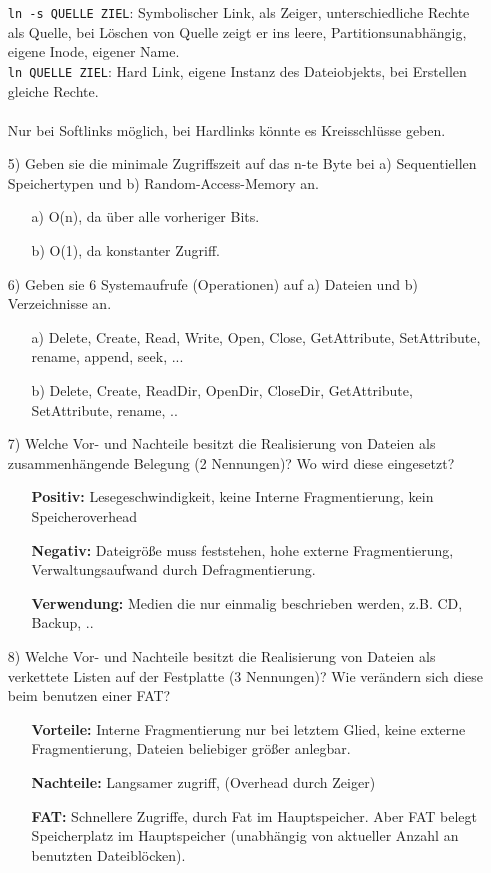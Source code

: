 \documentclass[11pt,a4paper]{article}
\begin{document}
\begin{itemize}
\texttt{ln -s QUELLE ZIEL}: Symbolischer Link, als Zeiger, unterschiedliche Rechte als Quelle, bei Löschen von Quelle zeigt er ins leere, Partitionsunabhängig, eigene Inode, eigener Name.\\
\texttt{ln QUELLE ZIEL}: Hard Link, eigene Instanz des Dateiobjekts, bei Erstellen gleiche Rechte.\\
\\ Nur bei Softlinks möglich, bei Hardlinks könnte es Kreisschlüsse geben.


\item[5)] Geben sie die minimale Zugriffszeit auf das n-te Byte bei a) Sequentiellen Speichertypen und b) Random-Access-Memory an.
\begin{itemize}
\item[a)] O(n), da über alle vorheriger Bits.
\item[b)] O(1), da konstanter Zugriff. 
\end{itemize}

\item[6)] Geben sie 6 Systemaufrufe (Operationen) auf a) Dateien und b) Verzeichnisse an.
\begin{itemize}
\item[a)] Delete, Create, Read, Write, Open, Close, GetAttribute, SetAttribute, rename, append, seek, ...
\item[b)] Delete, Create, ReadDir, OpenDir, CloseDir, GetAttribute, SetAttribute, rename, ..
\end{itemize}


\item[7)] Welche Vor- und Nachteile besitzt die Realisierung von Dateien als zusammenhängende Belegung (2 Nennungen)? Wo wird diese eingesetzt?
\begin{itemize}
\item[] \textbf{Positiv:} Lesegeschwindigkeit, keine Interne Fragmentierung, kein Speicheroverhead
\item[] \textbf{Negativ:} Dateigröße muss feststehen, hohe externe Fragmentierung, Verwaltungsaufwand durch Defragmentierung.
\item[] \textbf{Verwendung:} Medien die nur einmalig beschrieben werden, z.B. CD, Backup, ..
\end{itemize}

\item[8)] Welche Vor- und Nachteile besitzt die Realisierung von Dateien als verkettete Listen auf der Festplatte (3 Nennungen)? Wie verändern sich diese beim benutzen einer FAT?
\begin{itemize}
\item[] \textbf{Vorteile:} Interne Fragmentierung nur bei letztem Glied, keine externe Fragmentierung, Dateien beliebiger größer anlegbar.
\item[] \textbf{Nachteile:} Langsamer zugriff, (Overhead durch Zeiger)
\item[] \textbf{FAT:} Schnellere Zugriffe, durch Fat im Hauptspeicher. Aber FAT belegt Speicherplatz im Hauptspeicher (unabhängig von aktueller Anzahl an benutzten Dateiblöcken).
\end{itemize}


\end{itemize}
\end{document}
